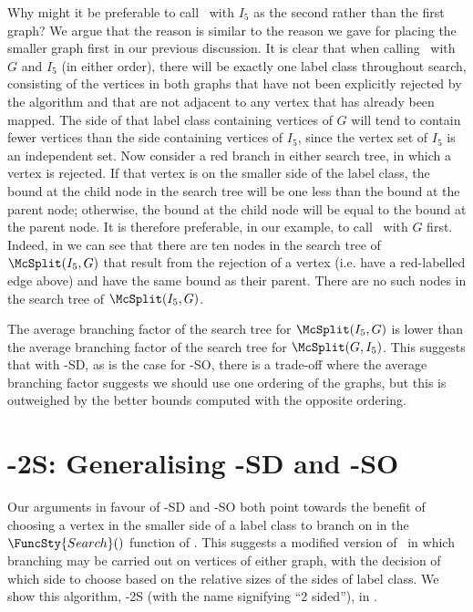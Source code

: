 Why might it be preferable to call \McSplit\ with $I_5$ as the second
rather than the first graph?  We argue
that the reason is similar to the reason we gave for placing the smaller graph
first in our previous discussion.  It is clear that when calling \McSplit\ with
$G$ and $I_5$ (in either order), there will be exactly one label class throughout
search, consisting of the vertices in both graphs that have not been explicitly
rejected by the algorithm and that are not adjacent to any vertex that has already
been mapped.  The side of that label class containing vertices of $G$ will tend to
contain fewer vertices than the side containing vertices of $I_5$, since the vertex set of $I_5$ is
an independent set.  
Now consider a red branch in either search tree, in which a vertex is rejected.
If that vertex is on the smaller side of the label class, the bound at the child node
in the search tree will be one less than the bound at the parent node; otherwise,
the bound at the child node will be equal to the bound at the parent node.  It is
therefore preferable, in our example, to call \McSplit\ with $G$ first.  Indeed,
in  we can see that there are ten
nodes in the search tree of $\McSplit(I_5, G)$ that result from the rejection of
a vertex (i.e. have a red-labelled edge above) and have the same bound as their
parent.  There are no such nodes in the search tree of $\McSplit(I_5, G)$.

The average branching factor of the search tree for $\McSplit(I_5, G)$ is lower
than the average branching factor of the search tree for $\McSplit(G, I_5)$.  This
suggests that with \McSplit-SD, as is the case for \McSplit-SO, there is a trade-off
where the average branching factor suggests we should use one ordering of the
graphs, but this is outweighed by the better bounds computed with the opposite
ordering.

\section{\McSplit-2S: Generalising \McSplit-SD and \McSplit-SO}\label{sec:mcsplit2}

Our arguments in favour of \McSplit-SD and \McSplit-SO both point towards the benefit
of choosing a vertex in the smaller side of a label class to branch on in the
$\FuncSty{Search}()$ function of \McSplit.  This suggests a modified version of \McSplit\ in
which branching may be carried out on vertices of either graph, with the decision of
which side to choose based on the relative sizes of the sides of label class.  We
show this algorithm, \McSplit-2S (with the name signifying ``2 sided''), in .

